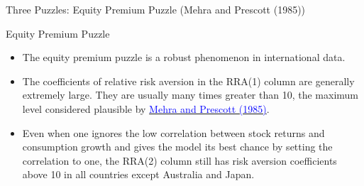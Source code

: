 \documentclass{beamer}
\begin{document}
\begin{frame}{Three Puzzles: Equity Premium Puzzle (Mehra and Prescott (1985))}
\begin{table} [!htbp]
\begin{minipage}{110mm}
	\end{minipage}
	\end{table}
\end{frame}

\begin{frame}{Equity Premium Puzzle}
	\begin{itemize}
		\item The equity premium puzzle is a robust phenomenon in international data.
		\item The coefficients of relative risk aversion in the RRA(1) column are generally extremely large. They are usually many times greater than 10, the maximum level considered plausible by \href{https://doi.org/10.1016/0304-3932(85)90061-3}{\textcolor{blue}{Mehra and Prescott (1985)}}.
		\item Even when one ignores the low correlation between stock returns and
		consumption growth and gives the model its best chance by setting the correlation to one, the RRA(2) column still has risk aversion coefficients above 10 in all countries except Australia and Japan.
	\end{itemize}
\end{frame}
\end{document}
